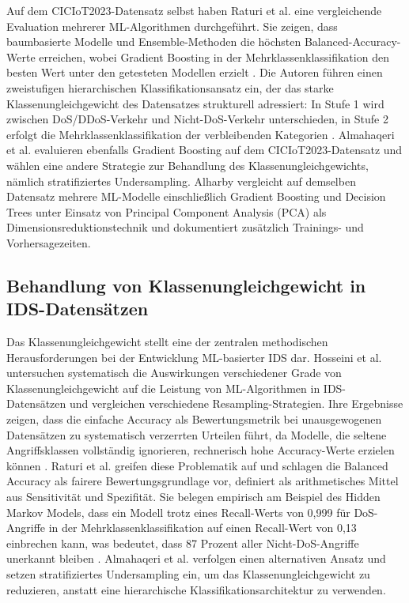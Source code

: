 Auf dem CICIoT2023-Datensatz selbst haben Raturi et al. \cite{raturi2026exploratory} eine vergleichende Evaluation mehrerer ML-Algorithmen durchgeführt. Sie zeigen, dass baumbasierte Modelle und Ensemble-Methoden die höchsten Balanced-Accuracy-Werte erreichen, wobei Gradient Boosting in der Mehrklassenklassifikation den besten Wert unter den getesteten Modellen erzielt \cite{raturi2026exploratory}. Die Autoren führen einen zweistufigen hierarchischen Klassifikationsansatz ein, der das starke Klassenungleichgewicht des Datensatzes strukturell adressiert: In Stufe 1 wird zwischen DoS/DDoS-Verkehr und Nicht-DoS-Verkehr unterschieden, in Stufe 2 erfolgt die Mehrklassenklassifikation der verbleibenden Kategorien \cite{raturi2026exploratory}. Almahaqeri et al. \cite{almahaqeri2026gradient} evaluieren ebenfalls Gradient Boosting auf dem CICIoT2023-Datensatz und wählen eine andere Strategie zur Behandlung des Klassenungleichgewichts, nämlich stratifiziertes Undersampling. Alharby \cite{alharby2025ciciot} vergleicht auf demselben Datensatz mehrere ML-Modelle einschließlich Gradient Boosting und Decision Trees unter Einsatz von Principal Component Analysis (PCA) als Dimensionsreduktionstechnik und dokumentiert zusätzlich Trainings- und Vorhersagezeiten.

\subsection{Behandlung von Klassenungleichgewicht in IDS-Datensätzen}
Das Klassenungleichgewicht stellt eine der zentralen methodischen Herausforderungen bei der Entwicklung ML-basierter IDS dar. Hosseini et al. \cite{hosseini2025imbalance} untersuchen systematisch die Auswirkungen verschiedener Grade von Klassenungleichgewicht auf die Leistung von ML-Algorithmen in IDS-Datensätzen und vergleichen verschiedene Resampling-Strategien. Ihre Ergebnisse zeigen, dass die einfache Accuracy als Bewertungsmetrik bei unausgewogenen Datensätzen zu systematisch verzerrten Urteilen führt, da Modelle, die seltene Angriffsklassen vollständig ignorieren, rechnerisch hohe Accuracy-Werte erzielen können \cite{hosseini2025imbalance}. Raturi et al. \cite{raturi2026exploratory} greifen diese Problematik auf und schlagen die Balanced Accuracy als fairere Bewertungsgrundlage vor, definiert als arithmetisches Mittel aus Sensitivität und Spezifität. Sie belegen empirisch am Beispiel des Hidden Markov Models, dass ein Modell trotz eines Recall-Werts von 0,999 für DoS-Angriffe in der Mehrklassenklassifikation auf einen Recall-Wert von 0,13 einbrechen kann, was bedeutet, dass 87 Prozent aller Nicht-DoS-Angriffe unerkannt bleiben \cite{raturi2026exploratory}. Almahaqeri et al. \cite{almahaqeri2026gradient} verfolgen einen alternativen Ansatz und setzen stratifiziertes Undersampling ein, um das Klassenungleichgewicht zu reduzieren, anstatt eine hierarchische Klassifikationsarchitektur zu verwenden.

